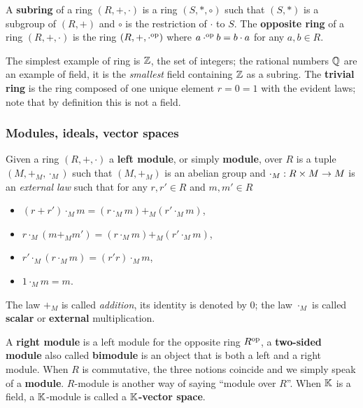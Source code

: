 A \textbf{subring} of a ring $(R,+,\cdot)$ is a ring
$(S,\ast,\circ)$ such that $(S,\ast)$ is a subgroup of $(R,+)$ and
$\circ$ is the restriction of $\cdot$ to $S$.  The
\textbf{opposite ring}
of a ring $(R,+,\cdot)$ is the ring $(R,+,\cdot^{\mathrm{op}})$
where $a\cdot^{\mathrm{op}} b=b\cdot a$ for any $a,b\in R$.

The simplest example of ring is $\mathbb{Z}$, the set of integers; the
rational numbers $\mathbb{Q}$ are an example of field, it is the
\emph{smallest} field containing $\mathbb{Z}$ as a subring. The
\textbf{trivial ring} is the ring composed of one
unique element $r=0=1$ with the evident laws; note that by definition
this is not a field.

\subsubsection{Modules, ideals, vector spaces}

Given a ring $(R,+,\cdot)$ a \textbf{left
  module}, or simply \textbf{module}, over $R$ is a tuple $(M, +_M,
\cdot_M)$ such that $(M,+_M)$ is an abelian group and $\cdot_M:R\times
M\rightarrow M$ is an \emph{external law} such that for any $r,r'\in R$ and
$m,m'\in R$
\begin{itemize}
\item $(r + r')\cdot_M m = (r \cdot_M m) +_M (r'\cdot_M m)$,
\item $r\cdot_M(m +_M m') = (r\cdot_M m) +_M (r'\cdot_M m)$,
\item $r'\cdot_M(r\cdot_M m ) = (r'r)\cdot_M m$,
\item $1\cdot_M m = m$.
\end{itemize}
The law $+_M$ is called \emph{addition}, its identity is denoted by
$0$; the law $\cdot_M$ is called
\textbf{scalar}
or
\textbf{external}
multiplication.

A \textbf{right module} is a left module
for the opposite ring $R^{\mathrm{op}}$, a
\textbf{two-sided module} also called
\textbf{bimodule} is an object that is both a left and
a right module. When $R$ is commutative, the three notions coincide
and we simply speak of a \textbf{module}.  $R$-module is
another way of saying ``module over $R$''. When $\mathbb{K}$ is a field, a
$\mathbb{K}$-module is called a \textbf{$\mathbb{K}$-vector
  space}.

